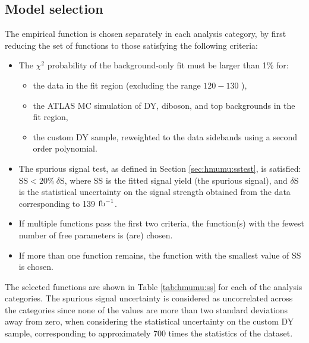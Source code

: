 \subsection{Model selection}
\label{sec:hmumu:model-sel}

The empirical function is chosen separately in each analysis
category, by first reducing the set of functions to those
satisfying the following criteria:
\begin{itemize}
\item The $\chi^2$ probability of the background-only fit must
be larger than 1\% for:
\begin{itemize}
\item the data in the fit region (excluding the range $120-130$ \GeV),
\item the ATLAS MC simulation of DY, diboson, and top backgrounds in the fit region,
\item the custom DY sample, reweighted to the data sidebands using a second order polynomial.
\end{itemize}
\item The spurious signal test, as defined in Section \ref{sec:hmumu:sstest},
is satisfied: $\text{SS} < 20\%~\delta$S, where SS is the fitted signal
yield (the spurious signal), and $\delta$S is the statistical uncertainty
on the signal strength obtained from the data corresponding to 139 $\text{fb}^{-1}$.
\item If multiple functions pass the first two criteria,
the function(s) with the fewest number of free parameters is (are)
chosen.
\item If more than one function remains, the function with the
smallest value of SS is chosen.
\end{itemize}
The selected functions are shown in Table \ref{tab:hmumu:ss}
for each of the analysis categories. The spurious signal uncertainty
is considered as uncorrelated across the categories since none
of the values are more than two standard deviations away from zero,
when considering the statistical uncertainty on the custom DY sample,
corresponding to approximately 700 times the statistics of the
dataset.
